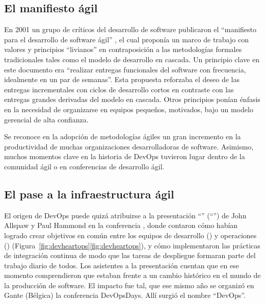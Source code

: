 \subsection{El manifiesto ágil}

En 2001 un grupo de críticos del desarrollo de software publicaron el
``manifiesto para el desarrollo de software ágil''
\cite{agilemanifesto}, el cual
proponía un marco de trabajo con valores y principios ``livianos'' en
contraposición a las metodologías formales tradicionales tales como el
modelo de desarrollo en cascada. Un principio clave en este documento
era ``realizar entregas funcionales del software con frecuencia,
idealmente en un par de semanas''. Esta propuesta reforzaba el deseo de
las entregas incrementales con ciclos de desarrollo cortos en
contraste con las entregas grandes derivadas del modelo en
cascada. Otros principios ponían énfasis en la necesidad de
organizarse en equipos pequeños, motivados, bajo un modelo gerencial
de alta confianza.

Se reconoce en la adopción de metodologías ágiles un gran incremento
en la productividad de muchas organizaciones desarrolladoras de
software. Asimismo, muchos momentos clave en la historia de DevOps
tuvieron lugar dentro de la comunidad ágil o en conferencias de
desarrollo ágil.

\subsection{El pase a la infraestructura ágil}

El origen de DevOps puede quizá atribuirse a la presentación
``''
(``'') de John Allspaw y Paul Hammond
\cite{flickr} en la
conferencia , donde contaron cómo habían logrado
crear objetivos en común entre los equipos de desarrollo
() y operaciones ()
(\iflatexml{}Figura~\ref{fig:devheartops}\else\autoref{fig:devheartops}\fi), y cómo
implementaron las prácticas de integración continua de modo que las
tareas de despliegue formaran parte del trabajo diario de todos. Los
asistentes a la presentación cuentan que en ese momento comprendieron
que estaban frente a un cambio histórico en el mundo de la producción
de software. El impacto fue tal, que ese mismo año se organizó en
Gante (Bélgica) la conferencia DevOpsDays. Allí surgió el nombre
``DevOps''.

